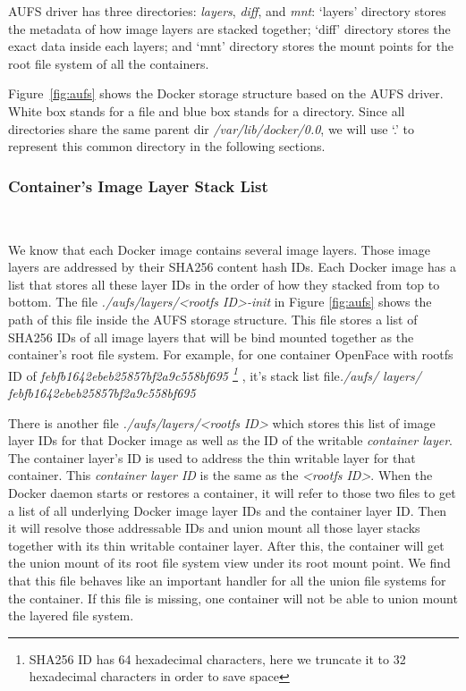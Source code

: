 AUFS driver has three directories: \textit{layers}, \textit{diff}, and \textit{mnt}: `layers' directory stores the metadata of how image layers are stacked together; `diff' directory stores the exact data inside each layers; and `mnt' directory stores the mount points for the root file system of all the containers. 

Figure~\ref{fig:aufs} shows the Docker storage structure based on the AUFS driver. White box stands for a file and blue box stands for a directory. Since all directories share the same parent dir \textit{/var/lib/docker/0.0}, we will use `.' to represent this common directory in the following sections. 


\smallbreak
\subsubsection{Container's Image Layer Stack List}
~\smallbreak

We know that each Docker image contains several image layers. Those image layers are addressed by their SHA256 content hash IDs. Each Docker image has a list that stores all these layer IDs in the order of how they stacked from top to bottom.
The file \textit{./aufs/layers/<rootfs ID>-init}  in Figure \ref{fig:aufs} shows the path of this file inside the AUFS storage structure. This file stores a list of SHA256 IDs of all image layers that will be bind mounted together as the container's root file system. For example, for one container OpenFace with rootfs ID of 
\textit{
febfb1642ebeb25857bf2a9c558bf695
\footnote{SHA256 ID has 64 hexadecimal characters, here we truncate it to 32 hexadecimal characters in order to save space}
}, it's stack list file\textit{./aufs/ layers/ febfb1642ebeb25857bf2a9c558bf695}

There is another file \textit{./aufs/layers/<rootfs ID>} which stores this list of image layer IDs for that Docker image as well as the ID of the writable \textit{container layer}.  The container layer's ID is used to address the thin writable layer for that container. This \textit{container layer ID} is the same as the \textit{<rootfs ID>}. 
When the Docker daemon starts or restores a container, it will refer to those two files to get a list of all underlying Docker image layer IDs and the container layer ID. Then it will resolve those addressable IDs and union mount all those layer stacks together with its thin writable container layer. After this, the container will get the union mount of its root file system view under its root mount point. 
We find that this file behaves like an important handler for all the union file systems for the container. If this file is missing, one container will not be able to union mount the layered file system.

